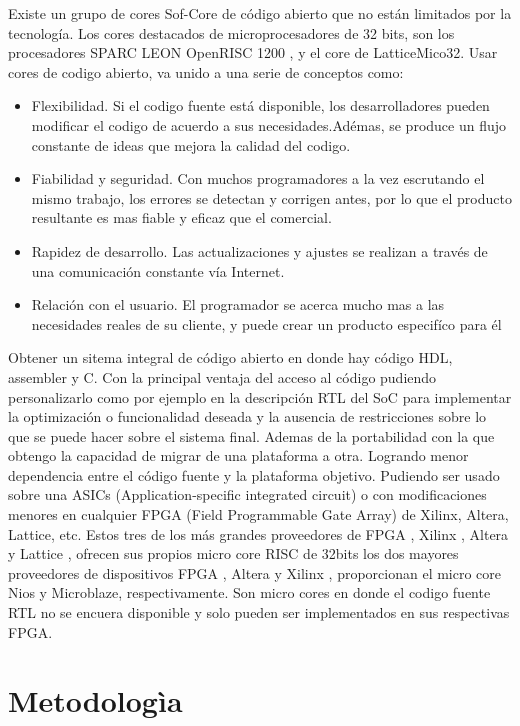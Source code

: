 Existe un grupo de cores Sof-Core de código abierto que no están limitados por la tecnología. Los cores destacados de microprocesadores de 32 bits, son los procesadores SPARC LEON OpenRISC 1200 , y el core de LatticeMico32. Usar cores de  codigo abierto,  va unido a una serie de conceptos como:
 \begin {itemize}
\item Flexibilidad. Si el codigo fuente está disponible, los desarrolladores pueden modificar el codigo de acuerdo a sus necesidades.Adémas, se produce un flujo constante de ideas que mejora la calidad del codigo.
\item Fiabilidad y seguridad. Con muchos programadores a la vez escrutando el mismo trabajo, los errores se detectan y corrigen antes, por lo que el producto resultante es mas fiable y eficaz que el comercial.
\item Rapidez de desarrollo. Las actualizaciones y ajustes se realizan a través de una comunicación constante vía Internet.
\item Relación con el usuario. El programador se acerca mucho mas a las necesidades reales de su cliente, y puede crear un producto especifíco para él
 \end {itemize}
 
Obtener un sitema integral de código abierto en donde hay código HDL, assembler y C. Con la principal ventaja del acceso al código pudiendo personalizarlo como por ejemplo en la descripción RTL del SoC para implementar la optimización o funcionalidad deseada y la ausencia de restricciones sobre lo que se puede hacer sobre el sistema final. Ademas de la portabilidad con la que obtengo la capacidad de migrar de una plataforma a otra. Logrando menor dependencia entre el código fuente y la plataforma objetivo. Pudiendo ser usado sobre una ASICs (Application-specific integrated circuit) o con modificaciones menores en cualquier FPGA (Field Programmable Gate Array) de Xilinx, Altera, Lattice, etc. 
Estos tres de los más grandes proveedores de FPGA , Xilinx , Altera y Lattice , ofrecen sus propios micro core RISC de 32bits los dos mayores proveedores de dispositivos FPGA , Altera y Xilinx , proporcionan el micro core Nios y Microblaze, respectivamente. Son micro cores  en donde el codigo fuente RTL no se encuera disponible y solo pueden ser implementados en sus respectivas FPGA.

\section{Metodologìa}



